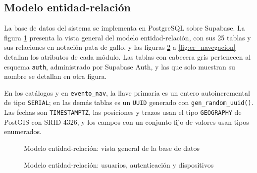 

\subsection{Modelo entidad-relación}

La base de datos del sistema se implementa en PostgreSQL sobre Supabase. La figura \ref{fig:er_general} presenta la vista general del modelo entidad-relación, con sus 25 tablas y sus relaciones en notación pata de gallo, y las figuras \ref{fig:er_usuarios} a \ref{fig:er_navegacion} detallan los atributos de cada módulo. Las tablas con cabecera gris pertenecen al esquema \texttt{auth}, administrado por Supabase Auth, y las que solo muestran su nombre se detallan en otra figura.

En los catálogos y en \texttt{evento\_nav}, la llave primaria es un entero autoincremental de tipo \texttt{SERIAL}; en las demás tablas es un \texttt{UUID} generado con \texttt{gen\_\allowbreak random\_\allowbreak uuid()}. Las fechas son \texttt{TIMESTAMPTZ}, las posiciones y trazos usan el tipo \texttt{GEOGRAPHY} de PostGIS con SRID 4326, y los campos con un conjunto fijo de valores usan tipos enumerados.

\begin{figure}
    \centering
    
    \caption{Modelo entidad-relación: vista general de la base de datos}
    \label{fig:er_general}
\end{figure}

\begin{figure}
    \centering
    
    \caption{Modelo entidad-relación: usuarios, autenticación y dispositivos}
    \label{fig:er_usuarios}
\end{figure}


